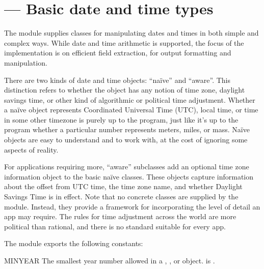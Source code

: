  
\section{ ---
         Basic date and time types}



\newcommand{\Naive}{Na\"ive}
\newcommand{\naive}{na\"ive}

The  module supplies classes for manipulating dates
and times in both simple and complex ways.  While date and time
arithmetic is supported, the focus of the implementation is on
efficient field extraction, for output formatting and manipulation.

There are two kinds of date and time objects: ``\naive'' and ``aware''.
This distinction refers to whether the object has any notion of time
zone, daylight savings time, or other kind of algorithmic or political
time adjustment.  Whether a {\naive}  object represents
Coordinated Universal Time (UTC), local time, or time in some other
timezone is purely up to the program, just like it's up to the program
whether a particular number represents meters, miles, or mass.  {\Naive}
 objects are easy to understand and to work with, at
the cost of ignoring some aspects of reality.

For applications requiring more, ``aware''  subclasses add an
optional time zone information object to the basic {\naive} classes.
These  objects capture information about the offset from
UTC time, the time zone name, and whether Daylight Savings Time is in
effect.  Note that no concrete  classes are supplied by
the  module.  Instead, they provide a framework for
incorporating the level of detail an app may require.  The rules for
time adjustment across the world are more political than rational, and
there is no standard suitable for every app.

The  module exports the following constants:

\begin{datadesc}{MINYEAR}
  The smallest year number allowed in a ,
  , or  object.  
  is .
\end{datadesc}

